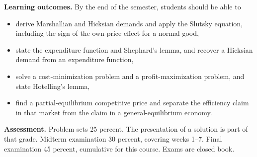 \documentclass[11pt]{article}
\begin{document}
\textbf{Learning outcomes.}
By the end of the semester, students should be able to
\begin{itemize}
\item derive Marshallian and Hicksian demands and apply the Slutsky equation, including the sign of the own-price effect for a normal good,
\item state the expenditure function and Shephard's lemma, and recover a Hicksian demand from an expenditure function,
\item solve a cost-minimization problem and a profit-maximization problem, and state Hotelling's lemma,
\item find a partial-equilibrium competitive price and separate the efficiency claim in that market from the claim in a general-equilibrium economy.
\end{itemize}

\textbf{Assessment.}
Problem sets 25 percent. The presentation of a solution is part of that grade. Midterm examination 30 percent, covering weeks 1--7. Final examination 45 percent, cumulative for this course. Exams are closed book.
\end{document}
